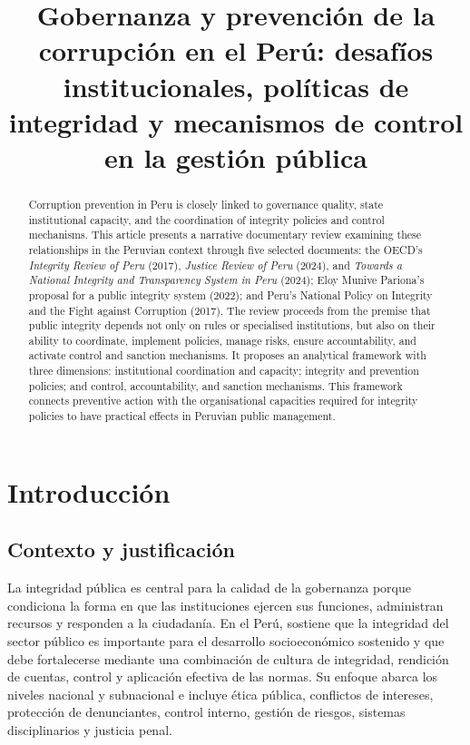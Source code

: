 \documentclass[Afour,sageh,times]{sagej}
\begin{document}

\author{}  %
\title{Gobernanza y prevención de la corrupción en el Perú: desafíos institucionales, políticas de integridad y mecanismos de control en la gestión pública}

\begin{abstract}
Corruption prevention in Peru is closely linked to governance quality, state institutional capacity, and the coordination of integrity policies and control mechanisms. This article presents a narrative documentary review examining these relationships in the Peruvian context through five selected documents: the OECD's \textit{Integrity Review of Peru} (2017), \textit{Justice Review of Peru} (2024), and \textit{Towards a National Integrity and Transparency System in Peru} (2024); Eloy Munive Pariona's proposal for a public integrity system (2022); and Peru's National Policy on Integrity and the Fight against Corruption (2017). The review proceeds from the premise that public integrity depends not only on rules or specialised institutions, but also on their ability to coordinate, implement policies, manage risks, ensure accountability, and activate control and sanction mechanisms. It proposes an analytical framework with three dimensions: institutional coordination and capacity; integrity and prevention policies; and control, accountability, and sanction mechanisms. This framework connects preventive action with the organisational capacities required for integrity policies to have practical effects in Peruvian public management.
\end{abstract}


\maketitle

\section{Introducción}
\subsection{Contexto y justificación}
La integridad pública es central para la calidad de la gobernanza porque condiciona la forma en que las instituciones ejercen sus funciones, administran recursos y responden a la ciudadanía. En el Perú, \citet{oecd2017integrity} sostiene que la integridad del sector público es importante para el desarrollo socioeconómico sostenido y que debe fortalecerse mediante una combinación de cultura de integridad, rendición de cuentas, control y aplicación efectiva de las normas. Su enfoque abarca los niveles nacional y subnacional e incluye ética pública, conflictos de intereses, protección de denunciantes, control interno, gestión de riesgos, sistemas disciplinarios y justicia penal.
\end{document}
